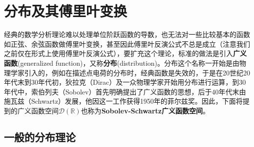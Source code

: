 \section{分布及其傅里叶变换}\label{sec:Distributions}

经典的数学分析理论难以处理单位阶跃函数的导数，也无法对一些比较基本的函数如正弦、余弦函数做傅里叶变换，甚至因此傅里叶反演公式不总是成立（注意我们之前仅在形式上使用傅里叶反演公式），要扩充这个理论，标准的做法是引入\textbf{广义函数}(generalized function)，又称\textbf{分布}(distribution)。分布这个名称一开始是由物理学家引入的，例如在描述点电荷的分布时，经典函数是失效的，于是在20世纪20年代末到30年代初，狄拉克（Dirac）及一众物理学家开始用分布进行运算，到30年代中，索伯列夫（Sobolev）首先明确提出了广义函数的思想，后于40年代末由施瓦兹（Schwartz）发展，他因这一工作获得1950年的菲尔兹奖。因此，下面将提到的广义函数空间$\mathcal{D}(\mathbb{R})$也称为\textbf{Sobolev-Schwartz广义函数空间}\cite{zorich}。

\subsection{一般的分布理论}\label{sub:general_distributions}

